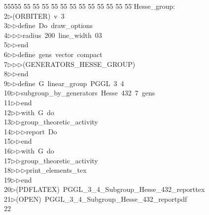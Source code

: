 %
%
\begin{tabbing}
55555 \= 55 \= 55 \= 55 \= 55 \= 55 \= 55 \= 55 \= 55 \= 55 \= 55 \= 55 \= 55 \= \>Hesse\_group:\\[0pt]
2\>$\triangleright$\>(ORBITER)\ v\ 3\ \\[0pt]
3\>$\triangleright$\>$\triangleright$\>define\ Do\ draw\_options\ \\[0pt]
4\>$\triangleright$\>$\triangleright$\>$\triangleright$\>radius\ 200\ line\_width\ 03\ \\[0pt]
5\>$\triangleright$\>$\triangleright$\>end\ \\[0pt]
6\>$\triangleright$\>$\triangleright$\>define\ gens\ vector\ compact\ \\[0pt]
7\>$\triangleright$\>$\triangleright$\>$\triangleright$\>(GENERATORS\_HESSE\_GROUP)\ \\[0pt]
8\>$\triangleright$\>$\triangleright$\>end\ \\[0pt]
9\>$\triangleright$\>$\triangleright$\>define\ G\ linear\_group\ PGGL\ 3\ 4\ \\[0pt]
10\>$\triangleright$\>$\triangleright$\>subgroup\_by\_generators\ Hesse\ 432\ 7\ gens\ \\[0pt]
11\>$\triangleright$\>$\triangleright$\>end\ \\[0pt]
12\>$\triangleright$\>$\triangleright$\>with\ G\ do\ \\[0pt]
13\>$\triangleright$\>$\triangleright$\>group\_theoretic\_activity\ \\[0pt]
14\>$\triangleright$\>$\triangleright$\>$\triangleright$\>report\ Do\ \\[0pt]
15\>$\triangleright$\>$\triangleright$\>end\ \\[0pt]
16\>$\triangleright$\>$\triangleright$\>with\ G\ do\ \\[0pt]
17\>$\triangleright$\>$\triangleright$\>group\_theoretic\_activity\ \\[0pt]
18\>$\triangleright$\>$\triangleright$\>$\triangleright$\>print\_elements\_tex\ \\[0pt]
19\>$\triangleright$\>$\triangleright$\>end\\[0pt]
20\>$\triangleright$\>(PDFLATEX)\ PGGL\_3\_4\_Subgroup\_Hesse\_432\_reporttex\\[0pt]
21\>$\triangleright$\>(OPEN)\ PGGL\_3\_4\_Subgroup\_Hesse\_432\_reportpdf\\[0pt]
22\>\end{tabbing}

